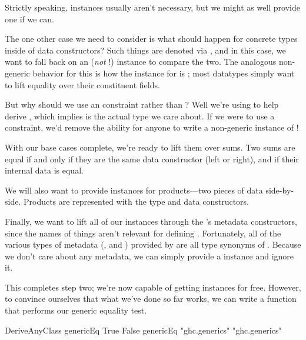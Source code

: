 \documentclass[book.tex]{subfiles}
\begin{document}
Strictly speaking,  instances usually aren't necessary, but we might as
well provide one if we can.


The one other case we need to consider is what should happen for concrete types
inside of data constructors? Such things are denoted via , and in this
case, we want to fall back on an  (\emph{not} !) instance to
compare the two. The analogous non-generic behavior for this is how the 
instance for  is ; most datatypes simply
want to lift equality over their constituent fields.


But why should we use an  constraint rather than ? Well we're
using  to help derive , which implies  is the actual type
we care about. If we were to use a  constraint, we'd remove the ability
for anyone to write a non-generic instance of !

With our base cases complete, we're ready to lift them over sums. Two sums are
equal if and only if they are the same data constructor (left or right), and if
their internal data is equal.


We will also want to provide  instances for products---two pieces of
data side-by-side. Products are represented with the \ty{(:*:)} type and data
constructors.


Finally, we want to lift all of our  instances through the 's
metadata constructors, since the names of things aren't relevant for defining
. Fortunately, all of the various types of metadata (,  and
) provided by  are all type synonyms of . Because
we don't care about any metadata, we can simply provide a  instance and
ignore it.


This completes step two; we're now capable of getting  instances for
free. However, to convince ourselves that what we've done so far works, we can
write a function that performs our generic equality test.


\begin{dorepl}{DeriveAnyClass}
genericEq True False
genericEq "ghc.generics" "ghc.generics"
\end{dorepl}
\end{document}

